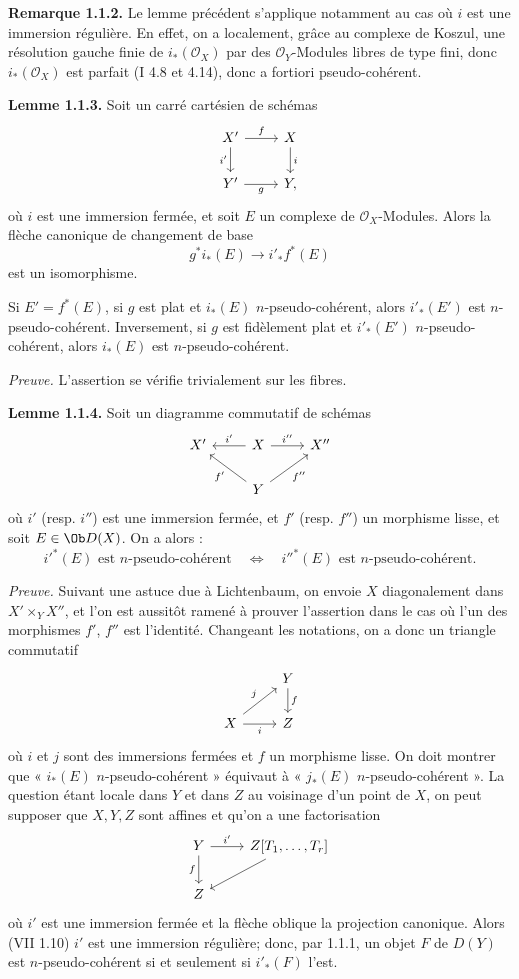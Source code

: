 \documentclass[11pt]{article}
\begin{document}
\textbf{Remarque 1.1.2.} Le lemme précédent s'applique notamment au cas où \(i\) est une immersion régulière. En effet, on a localement, grâce au complexe de Koszul, une résolution gauche finie de \(i_*(\mathcal O_X)\) par des \(\mathcal O_Y\)-Modules libres de type fini, donc \(i_*(\mathcal O_X)\) est parfait (I 4.8 et 4.14), donc a fortiori pseudo-cohérent.

\textbf{Lemme 1.1.3.} Soit un carré cartésien de schémas
\[
\begin{tikzcd}
X' \arrow[r,"f"] \arrow[d,"i'"'] & X \arrow[d,"i"]\\
Y' \arrow[r,"g"'] & Y,
\end{tikzcd}
\]
où \(i\) est une immersion fermée, et soit \(E\) un complexe de \(\mathcal O_X\)-Modules. Alors la flèche canonique de changement de base
\[
  g^*i_*(E)\longrightarrow i'_*f^*(E)
\]
est un isomorphisme.

Si \(E'=f^*(E)\), si \(g\) est plat et \(i_*(E)\) \(n\)-pseudo-cohérent, alors \(i'_*(E')\) est \(n\)-pseudo-cohérent. Inversement, si \(g\) est fidèlement plat et \(i'_*(E')\) \(n\)-pseudo-cohérent, alors \(i_*(E)\) est \(n\)-pseudo-cohérent.

\emph{Preuve.} L'assertion se vérifie trivialement sur les fibres.

\textbf{Lemme 1.1.4.} Soit un diagramme commutatif de schémas
\[
\begin{tikzcd}
X' & X \arrow[l,"i'"'] \arrow[r,"i''"] & X''\\
& Y \arrow[ul,"f'"] \arrow[ur,"f''"'] &
\end{tikzcd}
\]
où \(i'\) (resp. \(i''\)) est une immersion fermée, et \(f'\) (resp. \(f''\)) un morphisme lisse, et soit \(E\in\Ob D(X)\). On a alors :
\[
  i'^*(E)\text{ est }n\text{-pseudo-cohérent}
  \quad\Longleftrightarrow\quad
  i''^*(E)\text{ est }n\text{-pseudo-cohérent}.
\]

\emph{Preuve.} Suivant une astuce due à Lichtenbaum, on envoie \(X\) diagonalement dans \(X'\times_YX''\), et l'on est aussitôt ramené à prouver l'assertion dans le cas où l'un des morphismes \(f'\), \(f''\) est l'identité. Changeant les notations, on a donc un triangle commutatif
\[
\begin{tikzcd}
& Y \arrow[d,"f"]\\
X \arrow[r,"i"'] \arrow[ur,"j"] & Z
\end{tikzcd}
\]
où \(i\) et \(j\) sont des immersions fermées et \(f\) un morphisme lisse. On doit montrer que « \(i_*(E)\) \(n\)-pseudo-cohérent » équivaut à « \(j_*(E)\) \(n\)-pseudo-cohérent ». La question étant locale dans \(Y\) et dans \(Z\) au voisinage d'un point de \(X\), on peut supposer que \(X,Y,Z\) sont affines et qu'on a une factorisation
\[
\begin{tikzcd}
Y \arrow[r,"i'"] \arrow[d,"f"'] & Z[T_1,\ldots,T_r]\arrow[dl]\\
Z&
\end{tikzcd}
\]
où \(i'\) est une immersion fermée et la flèche oblique la projection canonique. Alors (VII 1.10) \(i'\) est une immersion régulière; donc, par 1.1.1, un objet \(F\) de \(D(Y)\) est \(n\)-pseudo-cohérent si et seulement si \(i'_*(F)\) l'est.
\end{document}
